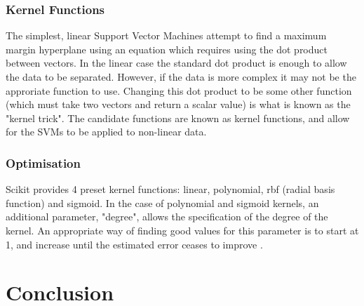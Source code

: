 \subsubsection{Kernel Functions}
The simplest, linear Support Vector Machines attempt to find a maximum margin hyperplane using an equation which requires using the dot product between vectors. In the linear case the standard dot product is enough to allow the data to be separated. However, if the data is more complex it may not be the approriate function to use. Changing this dot product to be some other function (which must take two vectors and return a scalar value) is what is known as the "kernel trick". The candidate functions are known as kernel functions, and allow for the SVMs to be applied to non-linear data. 

\subsubsection{Optimisation}
Scikit provides 4 preset kernel functions: linear, polynomial, rbf (radial basis function) and sigmoid. In the case of polynomial and sigmoid kernels, an additional parameter, "degree", allows the specification of the degree of the kernel. An appropriate way of finding good values for this parameter is to start at 1, and increase until the estimated error ceases to improve \cite{witten2011data}. 



\section{Conclusion}

